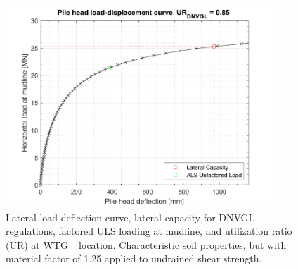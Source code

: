 \begin{figure}[!htbp]
\includegraphics[width=0.9\textwidth]{AppendixGenerationFiles/ProjectLocation/utilization_ratio_DNV.png}
\caption{Lateral load-deflection curve, lateral capacity for DNVGL regulations, factored ULS loading at mudline, and utilization ratio (UR) at WTG {\ID_location}. Characteristic soil properties, but with material factor of 1.25 applied to undrained shear strength.}
\label{DNV}\end{figure}
